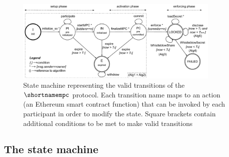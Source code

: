 
\begin{figure}[t]
	\centering
	\includegraphics[width=0.9\textwidth]{fig/protocol_fsm_simple_version.pdf}
	\caption{State machine representing the valid transitions of the $\shortnamempc$ protocol. Each transition name maps to an action (an Ethereum smart contract function) that can be invoked by each participant in order to modify the state. Square brackets contain additional conditions to be met to make valid transitions}
	\label{fig:fsm}
\end{figure}

\subsection{The \shortname state machine}\label{sect:ityt_exec}
 
